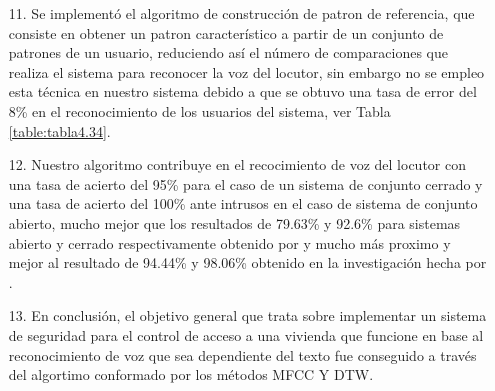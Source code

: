 \begin{enumerate}
\item[11.]Se implementó el algoritmo de construcción de patron de referencia, que consiste en obtener un patron característico a partir de un conjunto de patrones de un usuario, reduciendo así el número de comparaciones que realiza el sistema para reconocer la voz del locutor, sin embargo no se empleo esta técnica en nuestro sistema debido a que se obtuvo una tasa de error del 8\% en el reconocimiento de los usuarios del sistema, ver Tabla \ref{table:tabla4.34}.

\item[12.]Nuestro algoritmo contribuye en el recocimiento de voz del locutor con una tasa de acierto del 95\% para el caso de un sistema de conjunto cerrado y una tasa de acierto del 100\% ante intrusos en el caso de sistema de conjunto abierto, mucho mejor que los resultados de 79.63\% y 92.6\% para sistemas abierto y cerrado respectivamente obtenido por \cite{eyra} y mucho más proximo y mejor al resultado de 94.44\% y 98.06\% obtenido en la investigación hecha por \cite{varela}.

\item[13.]En conclusión, el objetivo general que trata sobre implementar un sistema de seguridad para el control de acceso a una vivienda que funcione en base al reconocimiento de voz que sea dependiente del texto fue conseguido a través del algortimo conformado por los métodos MFCC Y DTW.
\end{enumerate}

